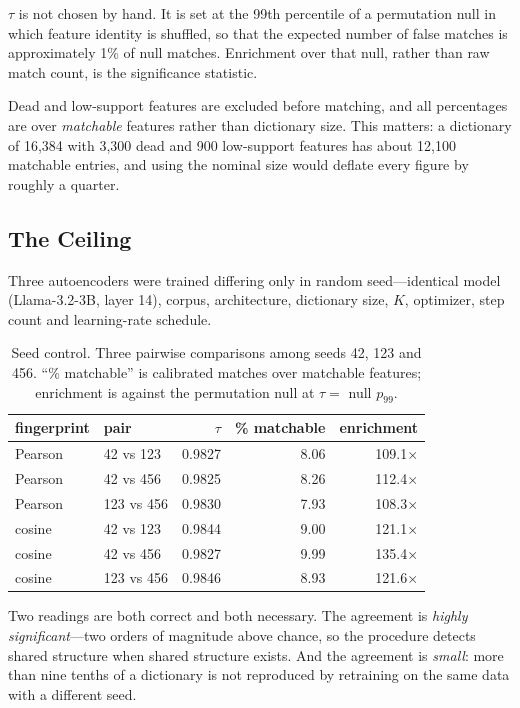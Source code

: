 \documentclass[11pt,a4paper]{article}
\begin{document}
$\tau$ is not chosen by hand. It is set at the 99th percentile of a permutation null in
which feature identity is shuffled, so that the expected number of false matches is
approximately 1\% of null matches. Enrichment over that null, rather than raw match
count, is the significance statistic.

Dead and low-support features are excluded before matching, and all percentages are
over \emph{matchable} features rather than dictionary size. This matters: a dictionary
of 16{,}384 with 3{,}300 dead and 900 low-support features has about 12{,}100 matchable
entries, and using the nominal size would deflate every figure by roughly a quarter.

\subsection{The Ceiling}
\label{sec:ceiling}

Three autoencoders were trained differing only in random seed---identical model
(Llama-3.2-3B, layer 14), corpus, architecture, dictionary size, $K$, optimizer, step
count and learning-rate schedule.

\begin{table}[H]
  \centering
  \caption{Seed control. Three pairwise comparisons among seeds 42, 123 and 456.
    ``\% matchable'' is calibrated matches over matchable features; enrichment is
    against the permutation null at $\tau = $ null $p_{99}$.}
  \label{tab:ceiling}
  \smallskip
  \begin{tabular}{llrrr}
    \toprule
    fingerprint & pair & $\tau$ & \% matchable & enrichment \\
    \midrule
    Pearson & 42 vs 123  & 0.9827 & 8.06 & 109.1$\times$ \\
    Pearson & 42 vs 456  & 0.9825 & 8.26 & 112.4$\times$ \\
    Pearson & 123 vs 456 & 0.9830 & 7.93 & 108.3$\times$ \\
    \midrule
    cosine  & 42 vs 123  & 0.9844 & 9.00 & 121.1$\times$ \\
    cosine  & 42 vs 456  & 0.9827 & 9.99 & 135.4$\times$ \\
    cosine  & 123 vs 456 & 0.9846 & 8.93 & 121.6$\times$ \\
    \bottomrule
  \end{tabular}
\end{table}

Two readings are both correct and both necessary. The agreement is \emph{highly
significant}---two orders of magnitude above chance, so the procedure detects shared
structure when shared structure exists. And the agreement is \emph{small}: more than
nine tenths of a dictionary is not reproduced by retraining on the same data with a
different seed.
\end{document}
